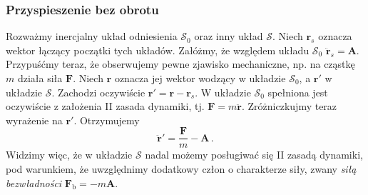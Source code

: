 \documentclass[../main.tex]{subfiles}
\begin{document}
\subsubsection{Przyspieszenie bez obrotu}
Rozważmy inercjalny układ odniesienia \(\mathcal{S}_0\) oraz inny układ \(\mathcal{S}\). Niech \(\mathbf{r}_s\) oznacza wektor łączący początki tych układów. Załóżmy, że względem układu \(\mathcal{S}_0\) \(\ddot{\mathbf{r}}_s=\mathbf{A}\). Przypuśćmy teraz, że obserwujemy pewne zjawisko mechaniczne, np. na cząstkę \(m\) działa siła \(\mathbf{F}\). Niech \(\mathbf{r}\) oznacza jej wektor wodzący w układzie \(\mathcal{S}_0\), a \(\mathbf{r}'\) w układzie \(\mathcal{S}\). Zachodzi oczywiście \(\mathbf{r}'=\mathbf{r}-\mathbf{r}_s\). W układzie \(\mathcal{S}_0\) spełniona jest oczywiście z założenia II zasada dynamiki, tj. \(\mathbf{F}=m\ddot{\mathbf{r}}\). Zróżniczkujmy teraz wyrażenie na \(\mathbf{r}'\). Otrzymujemy
\begin{equation*}
    \ddot{\mathbf{r}}'=\frac{\mathbf{F}}{m}-\mathbf{A}\,.
\end{equation*}
Widzimy więc, że w układzie \(\mathcal{S}\) nadal możemy posługiwać się II zasadą dynamiki, pod warunkiem, że uwzględnimy dodatkowy człon o charakterze siły, zwany \textit{siłą bezwładności} \(\mathbf{F}_\text{b}=-m\mathbf{A}\).
\end{document}
